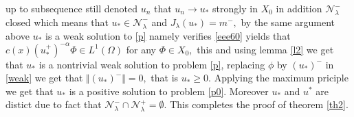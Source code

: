 \documentclass[10pt,twoside,reqno,centertags,draft]{amsart}
\begin{document}
 up to subsequence still denoted $ u_n$ that $ u_n \longrightarrow u_*$ strongly in $ X_0$ in addition $ \mathcal{N}_{\lambda}^{-}$ closed which means that 
 $ u_* \in \mathcal{N}_{\lambda}^{-}$ and $ J_{\lambda}(u_*) =m^{-},$ by the same argument above $ u_*$ is a weak solution to \ref{p} namely verifies \ref{eee60} yields that $ c(x)(u_*^+)^{-\alpha}\Phi \in L^{1}(\Omega)$ for any $ \Phi \in X_0,$ this and using lemma \ref{l2} we get that $ u_*$ is a nontrivial weak solution to problem \ref{p}, replacing $ \phi $ by $ (u_*)^-$ in \ref{weak} we get that $ \Vert (u_*)^-\Vert =0,$ that is  $ u_* \geq 0.$ Applying the maximum priciple we get that $ u_*$ is a positive solution to problem \ref{p0}. Moreover $ u_* $ and $ u^*$ are distict due to fact that 
 $ \mathcal{N}_{\lambda}^{-} \cap \mathcal{N}_{\lambda}^{+} =\emptyset.$ This completes the proof of theorem \ref{th2}.
\newpage
{}


\end{document}
